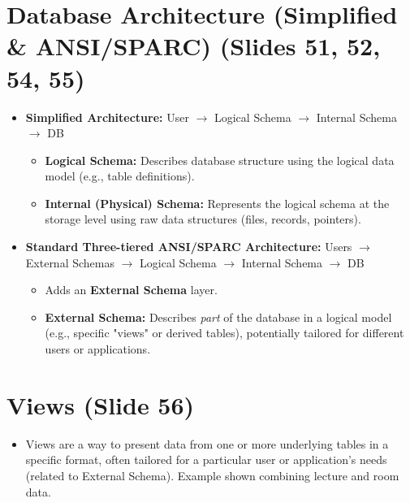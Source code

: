 \documentclass{article}
\begin{document}
	\section{Database Architecture (Simplified \& ANSI/SPARC) (Slides 51, 52, 54, 55)}
	\begin{itemize}
		\item \textbf{Simplified Architecture:} User $\rightarrow$ Logical Schema $\rightarrow$ Internal Schema $\rightarrow$ DB
		\begin{itemize}
			\item \textbf{Logical Schema:} Describes database structure using the logical data model (e.g., table definitions).
			\item \textbf{Internal (Physical) Schema:} Represents the logical schema at the storage level using raw data structures (files, records, pointers).
		\end{itemize}
		\item \textbf{Standard Three-tiered ANSI/SPARC Architecture:} Users $\rightarrow$ External Schemas $\rightarrow$ Logical Schema $\rightarrow$ Internal Schema $\rightarrow$ DB
		\begin{itemize}
			\item Adds an \textbf{External Schema} layer.
			\item \textbf{External Schema:} Describes \emph{part} of the database in a logical model (e.g., specific "views" or derived tables), potentially tailored for different users or applications.
		\end{itemize}
	\end{itemize}
	
	\section{Views (Slide 56)}
	\begin{itemize}
		\item Views are a way to present data from one or more underlying tables in a specific format, often tailored for a particular user or application's needs (related to External Schema). Example shown combining lecture and room data.
	\end{itemize}
	
\end{document}
